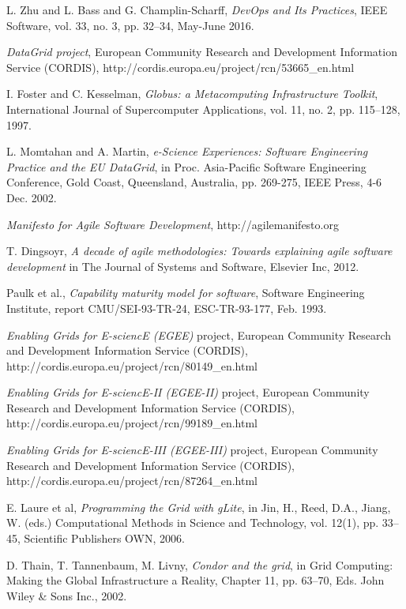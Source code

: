 \documentclass[journal]{IEEEtran}
\begin{document}
\begin{thebibliography}{1}

L. Zhu and L. Bass and G. Champlin-Scharff, \emph{DevOps and Its Practices}, 
IEEE Software, vol. 33, no. 3, pp. 32--34, May-June 2016.


\emph{DataGrid project}, European Community Research and Development
Information Service (CORDIS),
http://cordis.europa.eu/project/rcn/53665\_en.html

I. Foster and C. Kesselman, \emph{Globus: a Metacomputing Infrastructure
Toolkit}, International Journal of Supercomputer Applications, vol. 11, no. 2,
pp. 115–128, 1997.

L. Momtahan and A. Martin, \emph{e-Science Experiences: Software Engineering
Practice and the EU DataGrid}, in Proc. Asia-Pacific Software Engineering
Conference, Gold Coast, Queensland, Australia, pp. 269-275, IEEE Press,
4-6 Dec. 2002.

\emph{Manifesto for Agile Software Development}, http://agilemanifesto.org

T. Dingsoyr, \emph{A decade of agile methodologies: Towards explaining agile
software development} in The Journal of Systems and Software, Elsevier Inc,
2012.

Paulk et al., \emph{Capability maturity model for software}, Software
Engineering Institute, report CMU/SEI-93-TR-24, ESC-TR-93-177, Feb. 1993.

\emph{Enabling Grids for E-sciencE (EGEE)} project, European Community
Research and Development Information Service (CORDIS),
http://cordis.europa.eu/project/rcn/80149\_en.html

\emph{Enabling Grids for E-sciencE-II (EGEE-II)} project, European Community
Research and Development Information Service (CORDIS),
http://cordis.europa.eu/project/rcn/99189\_en.html

\emph{Enabling Grids for E-sciencE-III (EGEE-III)} project, European Community
Research and Development Information Service (CORDIS),
http://cordis.europa.eu/project/rcn/87264\_en.html

E. Laure et al, \emph{Programming the Grid with gLite}, in Jin, H., Reed, D.A.,
Jiang, W. (eds.) Computational Methods in Science and Technology, vol. 12(1),
pp. 33–45, Scientific Publishers OWN, 2006.

D. Thain, T. Tannenbaum, M. Livny, \emph{Condor and the grid}, in Grid
Computing: Making the Global Infrastructure a Reality, Chapter 11, pp. 63–70,
Eds. John Wiley \& Sons Inc., 2002.


\end{thebibliography}
\end{document}
